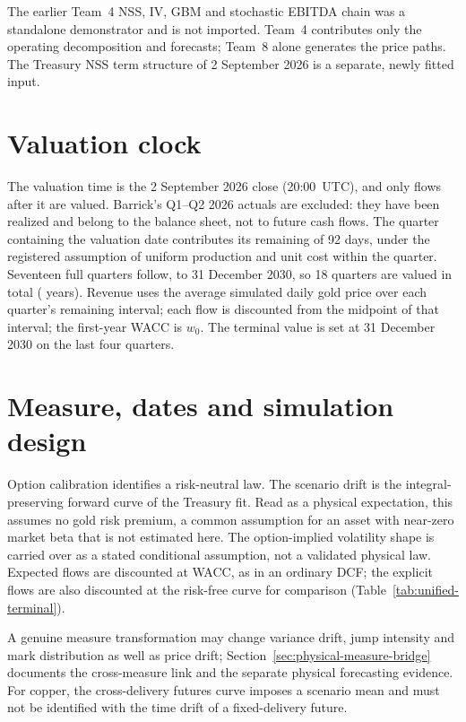 The earlier Team~4 NSS, IV, GBM and stochastic EBITDA chain was a standalone
demonstrator and is not imported. Team~4 contributes only the operating
decomposition and forecasts; Team~8 alone generates the price paths. The
Treasury NSS term structure of 2 September 2026 is a separate, newly fitted
input.

\section{Valuation clock}
\label{sec:valuation-clock}

The valuation time is the 2 September 2026 close (20:00~UTC), and only flows
after it are valued. Barrick's Q1--Q2 2026 actuals are excluded: they have
been realized and belong to the balance sheet, not to future cash flows. The
quarter containing the valuation date contributes its remaining \StubDays{} of
92 days, under the registered assumption of uniform production and unit cost
within the quarter. Seventeen full quarters follow, to 31 December 2030, so
18 quarters are valued in total (\HorizonYears{} years). Revenue uses the average simulated daily gold price
over each quarter's remaining interval; each flow is discounted from the
midpoint of that interval; the first-year WACC is $w_0$. The terminal value
is set at 31 December 2030 on the last four quarters.

\section{Measure, dates and simulation design}
\label{sec:unified-measure}

Option calibration identifies a risk-neutral law. The scenario drift is the
integral-preserving forward curve of the Treasury fit. Read as a physical
expectation, this assumes no gold risk premium, a common assumption for an
asset with near-zero market beta that is not estimated here. The
option-implied volatility shape is carried over as a stated conditional
assumption, not a validated physical law. Expected flows are discounted at
WACC, as in an ordinary DCF; the explicit flows are also discounted at the
risk-free curve for comparison (Table~\ref{tab:unified-terminal}).

A genuine measure transformation may change variance drift, jump intensity
and mark distribution as well as price drift; Section~\ref{sec:physical-measure-bridge}
documents the cross-measure link and the separate physical forecasting
evidence. For copper, the cross-delivery futures curve imposes a scenario mean
and must not be identified with the time drift of a fixed-delivery future.

